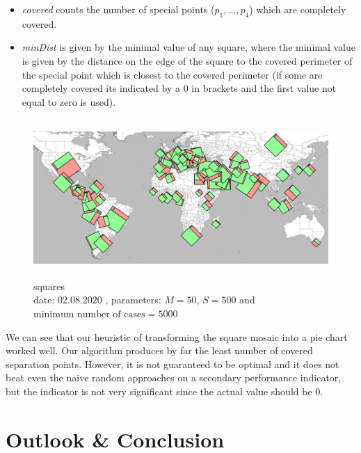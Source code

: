 \documentclass[a4paper,11pt]{article}
\begin{document}
\begin{itemize}
  \item \textit{covered} counts the number of special points ($p_1,...,p_4$) which are completely covered.
  \item \textit{minDist} is given by the minimal value of any square, where the minimal value is given by the distance on the edge of the square to the covered perimeter of the special point which is closest to the covered perimeter (if some are completely covered its indicated by a 0 in brackets and the first value not equal to zero is used).
\end{itemize}
\begin{figure}[b]
  \centering
  \includegraphics[height=6cm]{assets/squaresEval}
  \caption{squares\\
    date: 02.08.2020  , parameters: $M=50$, $S=500$ and $\text{minimum number of cases}=5000$  }
\end{figure}

We can see that our heuristic of transforming the square mosaic into a pie chart worked well. Our algorithm produces by far the least number of covered separation points. However, it is not guaranteed to be optimal and it does not beat even the naive random approaches on a secondary performance indicator, but the indicator is not very significant since the actual value should be 0.



\section{Outlook \& Conclusion}
\end{document}
